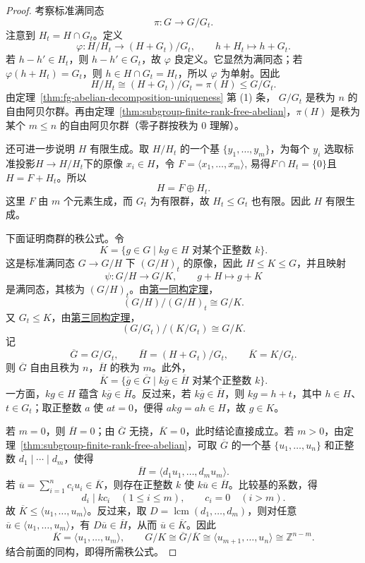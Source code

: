 \begin{proof}
考察标准满同态
\[
  \pi:G\longrightarrow G/G_t.
\]
注意到 $H_t=H\cap G_t$。定义
\[
  \varphi:H/H_t\longrightarrow(H+G_t)/G_t,\qquad
  h+H_t\longmapsto h+G_t.
\]
若 $h-h'\in H_t$，则 $h-h'\in G_t$，故 $\varphi$ 良定义。它显然为满同态；若 $\varphi(h+H_t)=G_t$，则 $h\in H\cap G_t=H_t$，所以 $\varphi$ 为单射。因此
\[
  H/H_t\cong(H+G_t)/G_t=\pi(H)\leq G/G_t.
\]
由定理~\ref{thm:fg-abelian-decomposition-uniqueness} 第 (1) 条，
$G/G_t$ 是秩为 $n$ 的自由阿贝尔群。再由定理~\ref{thm:subgroup-finite-rank-free-abelian}，$\pi(H)$ 是秩为某个 $m\leq n$ 的自由阿贝尔群（零子群按秩为 $0$ 理解）。

还可进一步说明 $H$ 有限生成。取 $H/H_t$ 的一个基 $\{y_1,\ldots,y_m\}$，为每个 $y_i$ 选取标准投影$H \rightarrow H/H_t$下的原像 $x_i\in H$，令 $F=\langle x_1,\ldots,x_m\rangle$, 易得$F\cap H_t=\{0\}$且$H=F+H_t$。所以
\[
  H=F\oplus H_t.
\]
这里 $F$ 由 $m$ 个元素生成，而 $G_t$ 为有限群，故 $H_t\leq G_t$ 也有限。因此 $H$ 有限生成。

下面证明商群的秩公式。令
\[
  K=\{g\in G\mid kg\in H\text{ 对某个正整数 }k\}.
\]
这是标准满同态 $G\to G/H$ 下 $(G/H)_t$ 的原像，因此 $H\leq K\leq G$，并且映射
\[
  \psi:G/H\longrightarrow G/K,\qquad
  g+H\longmapsto g+K
\]
是满同态，其核为 $(G/H)_t$。由\hyperref[cor:first-isomorphism]{第一同构定理}，
\[
  (G/H)/(G/H)_t\cong G/K.
\]
又 $G_t\leq K$，由\hyperref[cor:third-isomorphism]{第三同构定理}，
\[
  (G/G_t)/(K/G_t)\cong G/K.
\]
记
\[
  \overline G=G/G_t,\qquad
  \overline H=(H+G_t)/G_t,\qquad
  \overline K=K/G_t.
\]
则 $\overline G$ 自由且秩为 $n$，$\overline H$ 的秩为 $m$。此外，
\[
  \overline K=
  \{\overline g\in\overline G\mid
      k\overline g\in\overline H\text{ 对某个正整数 }k\}.
\]
一方面，$kg\in H$ 蕴含 $k\overline g\in\overline H$。反过来，若 $k\overline g\in\overline H$，则 $kg=h+t$，其中 $h\in H$、$t\in G_t$；取正整数 $a$ 使 $at=0$，便得 $akg=ah\in H$，故 $g\in K$。

若 $m=0$，则 $\overline H=0$；由 $\overline G$ 无挠，$\overline K=0$，此时结论直接成立。若 $m>0$，由定理~\ref{thm:subgroup-finite-rank-free-abelian}，可取 $\overline G$ 的一个基 $\{u_1,\ldots,u_n\}$ 和正整数
$d_1\mid\cdots\mid d_m$，使得
\[
  \overline H=\langle d_1u_1,\ldots,d_mu_m\rangle.
\]
若 $\overline u=\sum_{i=1}^{n}c_iu_i\in\overline K$，则存在正整数 $k$ 使 $k\overline u\in\overline H$。比较基的系数，得
\[
  d_i\mid kc_i\quad(1\leq i\leq m),\qquad
  c_i=0\quad(i>m).
\]
故 $\overline K\leq\langle u_1,\ldots,u_m\rangle$。反过来，取 $D=\operatorname{lcm}(d_1,\ldots,d_m)$，则对任意
$\overline u\in\langle u_1,\ldots,u_m\rangle$，有 $D\overline u\in\overline H$，从而 $\overline u\in\overline K$。因此
\[
  \overline K=\langle u_1,\ldots,u_m\rangle,\qquad
  G/K\cong\overline G/\overline K
      \cong\langle u_{m+1},\ldots,u_n\rangle
      \cong\mathbb Z^{n-m}.
\]
结合前面的同构，即得所需秩公式。
\end{proof}

